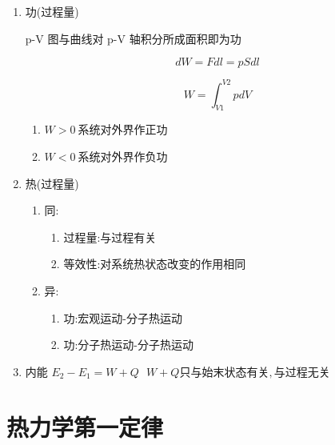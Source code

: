 \begin{enumerate}
    \item 功(过程量)

          p-V 图与曲线对 p-V 轴积分所成面积即为功

          \begin{equation}
              dW=Fdl=pSdl
          \end{equation}

          \begin{equation}
              W=\int_{V1}^{V2}{pdV}
          \end{equation}

          \begin{enumerate}
              \item $W>0~$系统对外界作正功
              \item $W<0~$系统对外界作负功
          \end{enumerate}

    \item 热(过程量)

          \begin{enumerate}
              \item  同:
                    \begin{enumerate}
                        \item 过程量:与过程有关
                        \item 等效性:对系统热状态改变的作用相同
                    \end{enumerate}

              \item 异:
                    \begin{enumerate}
                        \item 功:宏观运动-分子热运动
                        \item 功:分子热运动-分子热运动
                    \end{enumerate}
          \end{enumerate}

    \item 内能
          $E_2-E_1=W+Q~~~W+Q只与始末状态有关,与过程无关$

\end{enumerate}

\section{热力学第一定律}

